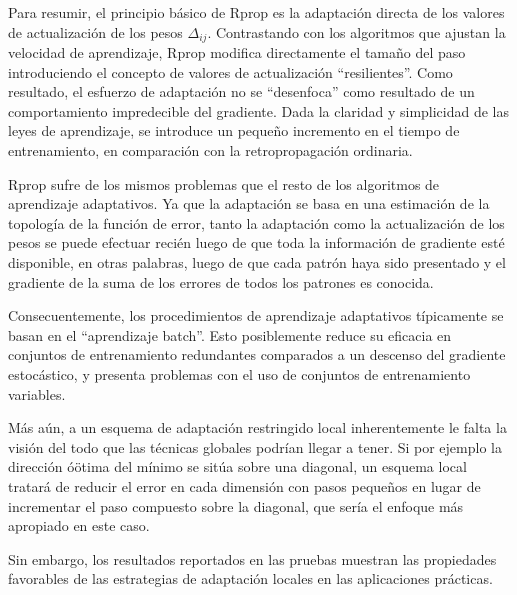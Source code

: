 Para resumir, el principio básico de Rprop es la adaptación directa de
los valores de actualización de los pesos $\Delta_{ij}$. Contrastando
con los algoritmos que ajustan la velocidad de aprendizaje, Rprop
modifica directamente el tamaño del paso introduciendo el concepto de
valores de actualización ``resilientes''. Como resultado, el esfuerzo
de adaptación no se ``desenfoca'' como resultado de un comportamiento
impredecible del gradiente. Dada la claridad y simplicidad de las
leyes de aprendizaje, se introduce un pequeño incremento en el tiempo de
entrenamiento, en comparación con la retropropagación ordinaria.

Rprop sufre de los mismos problemas que el resto de los algoritmos de
aprendizaje adaptativos. Ya que la adaptación se basa en una
estimación de la topología de la función de error, tanto la adaptación
como la actualización de los pesos se puede efectuar recién luego de
que toda la información de gradiente esté disponible, en otras
palabras, luego de que cada patrón haya sido presentado y el gradiente
de la suma de los errores de todos los patrones es conocida.

Consecuentemente, los procedimientos de aprendizaje adaptativos
típicamente se basan en el ``aprendizaje batch''. Esto posiblemente
reduce su eficacia en conjuntos de entrenamiento redundantes
comparados a un descenso del gradiente estocástico, y presenta
problemas con el uso de conjuntos de entrenamiento variables.

Más aún, a un esquema de adaptación restringido local inherentemente le
falta la visión del todo que las técnicas globales podrían llegar a
tener. Si por ejemplo la dirección óötima del mínimo se sitúa sobre
una diagonal, un esquema local tratará de reducir el error en cada
dimensión con pasos pequeños en lugar de incrementar el paso compuesto
sobre la diagonal, que sería el enfoque más apropiado en este caso.

Sin embargo, los resultados reportados en las pruebas
\cite{riedmiller} muestran las propiedades favorables de las
estrategias de adaptación locales en las aplicaciones prácticas.